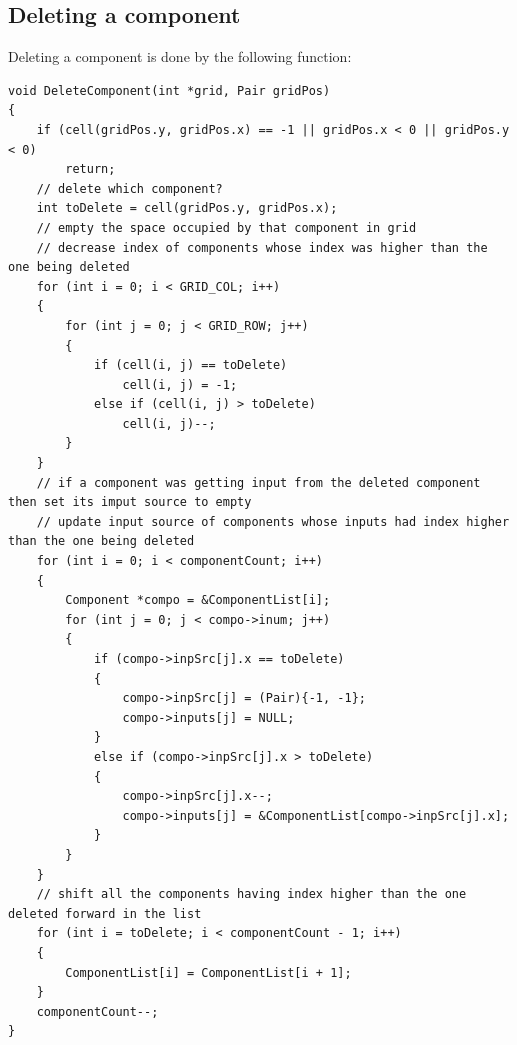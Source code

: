 \documentclass[report]{subfiles}
\begin{document}
\subsection{Deleting a component}
Deleting a component is done by the following function:
\begin{lstlisting}
void DeleteComponent(int *grid, Pair gridPos)
{
    if (cell(gridPos.y, gridPos.x) == -1 || gridPos.x < 0 || gridPos.y < 0)
        return;
    // delete which component?
    int toDelete = cell(gridPos.y, gridPos.x);
    // empty the space occupied by that component in grid
    // decrease index of components whose index was higher than the one being deleted
    for (int i = 0; i < GRID_COL; i++)
    {
        for (int j = 0; j < GRID_ROW; j++)
        {
            if (cell(i, j) == toDelete)
                cell(i, j) = -1;
            else if (cell(i, j) > toDelete)
                cell(i, j)--;
        }
    }
    // if a component was getting input from the deleted component then set its imput source to empty
    // update input source of components whose inputs had index higher than the one being deleted
    for (int i = 0; i < componentCount; i++)
    {
        Component *compo = &ComponentList[i];
        for (int j = 0; j < compo->inum; j++)
        {
            if (compo->inpSrc[j].x == toDelete)
            {
                compo->inpSrc[j] = (Pair){-1, -1};
                compo->inputs[j] = NULL;
            }
            else if (compo->inpSrc[j].x > toDelete)
            {
                compo->inpSrc[j].x--;
                compo->inputs[j] = &ComponentList[compo->inpSrc[j].x];
            }
        }
    }
    // shift all the components having index higher than the one deleted forward in the list
    for (int i = toDelete; i < componentCount - 1; i++)
    {
        ComponentList[i] = ComponentList[i + 1];
    }
    componentCount--;
}
\end{lstlisting}
\end{document}
